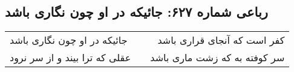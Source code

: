 \begin{center}
\section*{رباعی شماره ۶۲۷: جائیکه در او چون نگاری باشد}
\label{sec:0627}
\begin{longtable}{l p{0.5cm} r}
جائیکه در او چون نگاری باشد
&&
کفر است که آنجای قراری باشد
\\
عقلی که ترا بیند و از سر نرود
&&
سر کوفته به که زشت ماری باشد
\\
\end{longtable}
\end{center}
